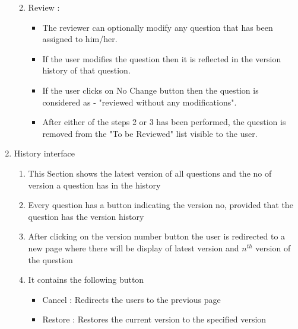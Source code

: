 \documentclass[a4paper,12pt,oneside]{book}
\begin{document}
\begin{enumerate}
\begin{enumerate}
\begin{itemize}
                \end{itemize}
            \item Review :
                \begin{itemize}
                    \item The reviewer can optionally modify any question that has been assigned to him/her.
                	\item If the user modifies the question then it is reflected in the version history of that question.
                	\item If the user clicks on No Change button then the question is considered as - "reviewed without any modifications".
                	\item After either of the steps 2 or 3 has been performed, the question is removed from the "To be Reviewed" list visible to the user.
	
                \end{itemize}

            \end{enumerate}
            
        \item History interface
            \begin{enumerate}
            \item This Section shows the latest version of all questions and the no of version a question has in the history
            \item Every question has a button indicating the version no, provided that the question has the version history
            \item After clicking on the version number button the user is redirected to a new page where there will be display of latest version and \(n^{th}\) version of the question
            \item It contains the following button
                            \begin{itemize}
                                \item Cancel : Redirects the users to the previous page
                                \item Restore : Restores the current version to the specified version
                            \end{itemize}
            \end{enumerate}
    \end{enumerate}

\vspace{2in}
\end{document}
